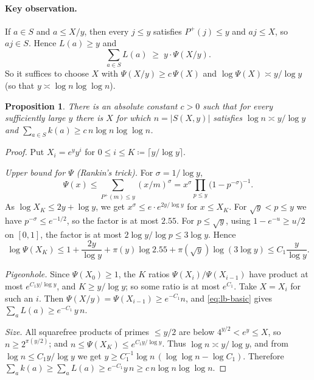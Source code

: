 \documentclass[11pt]{article}
\newtheorem{proposition}[theorem]{Proposition}
\theoremstyle{remark}
\newcommand{\Pplus}{P^{+}}
\begin{document}
\paragraph{Key observation.}
If $a\in S$ and $a\le X/y$, then every $j\le y$ satisfies $\Pplus(j)\le y$ and $aj\le X$, so $aj\in S$.
Hence $L(a)\ge y$ and
\begin{equation}\label{eq:lb-basic}
  \sum_{a\in S}L(a) \;\ge\; y\cdot \Psi(X/y).
\end{equation}
So it suffices to choose $X$ with $\Psi(X/y)\ge c\,\Psi(X)$ and $\log\Psi(X)\asymp y/\log y$ (so that $y\asymp\log n\log\log n$).

\begin{proposition}\label{prop:lb}
There is an absolute constant $c>0$ such that for every sufficiently large $y$ there is $X$ for which $n=|S(X,y)|$ satisfies $\log n\asymp y/\log y$ and $\sum_{a\in S}k(a)\ge c\,n\log n\log\log n$.
\end{proposition}

\begin{proof}
Put $X_i=e^{y}y^{i}$ for $0\le i\le K\coloneqq\lceil y/\log y\rceil$.

\emph{Upper bound for $\Psi$ (Rankin's trick).}
For $\sigma=1/\log y$,
\[
  \Psi(x)\le\sum_{\Pplus(m)\le y}(x/m)^{\sigma}=x^{\sigma}\prod_{p\le y}\bigl(1-p^{-\sigma}\bigr)^{-1}.
\]
As $\log X_K\le 2y+\log y$, we get $x^\sigma\le e\cdot e^{2y/\log y}$ for $x\le X_K$.
For $\sqrt y<p\le y$ we have $p^{-\sigma}\le e^{-1/2}$, so the factor is at most $2.55$.
For $p\le\sqrt y$, using $1-e^{-u}\ge u/2$ on $[0,1]$, the factor is at most $2\log y/\log p\le 3\log y$.
Hence
\[
  \log\Psi(X_K)\le 1+\frac{2y}{\log y}+\pi(y)\log 2.55+\pi(\sqrt y)\log(3\log y)\le C_1\frac{y}{\log y}.
\]

\emph{Pigeonhole.}
Since $\Psi(X_0)\ge1$, the $K$ ratios $\Psi(X_i)/\Psi(X_{i-1})$ have product at most $e^{C_1y/\log y}$, and $K\ge y/\log y$; so some ratio is at most $e^{C_1}$.
Take $X=X_i$ for such an $i$.
Then $\Psi(X/y)=\Psi(X_{i-1})\ge e^{-C_1}n$, and \eqref{eq:lb-basic} gives $\sum_a L(a)\ge e^{-C_1}\,y\,n$.

\emph{Size.}
All squarefree products of primes $\le y/2$ are below $4^{y/2}<e^{y}\le X$, so $n\ge 2^{\pi(y/2)}$; and $n\le\Psi(X_K)\le e^{C_1y/\log y}$.
Thus $\log n\asymp y/\log y$, and from $\log n\le C_1 y/\log y$ we get $y\ge C_1^{-1}\log n\,(\log\log n-\log C_1)$.
Therefore $\sum_a k(a)\ge\sum_a L(a)\ge e^{-C_1}y\,n\ge c\,n\log n\log\log n$.
\end{proof}
\end{document}
